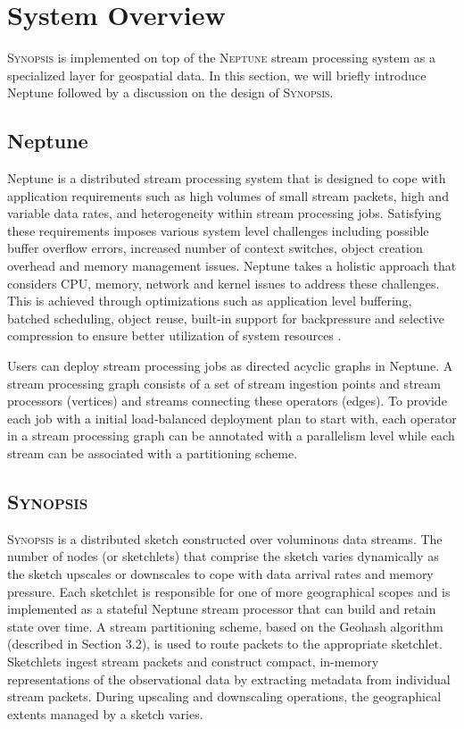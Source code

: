 \section{System Overview}
\label{sec:system}
\textsc{Synopsis} is implemented on top of the \textsc{Neptune} stream processing system \cite{buddhika2016neptune} as a specialized layer for geospatial data.
In this section, we will briefly introduce Neptune followed by a discussion on the design of \textsc{Synopsis}.

\subsection{Neptune}
Neptune is a distributed stream processing system that is designed to cope with application requirements such as high volumes of small stream packets, high and variable data rates, and heterogeneity within stream processing jobs.
Satisfying these requirements imposes various system level challenges including possible buffer overflow errors, increased number of context switches, object creation overhead and memory management issues.
Neptune takes a holistic approach that considers CPU, memory, network and kernel issues to address these challenges.
This is achieved through optimizations such as application level buffering, batched scheduling, object reuse, built-in support for backpressure and selective compression to ensure better utilization of system resources \cite{buddhika2016neptune}.

Users can deploy stream processing jobs as directed acyclic graphs in Neptune.
A stream processing graph consists of a set of stream ingestion points and stream processors (vertices) and streams connecting these operators (edges).
To provide each job with a initial load-balanced deployment plan to start with, each operator in a stream processing graph can be annotated with a parallelism level while each stream can be associated with a partitioning scheme.

\subsection{\textsc{Synopsis}}
\textsc{Synopsis} is a distributed sketch constructed over voluminous data streams.
The number of nodes (or sketchlets) that comprise the sketch varies dynamically as the sketch upscales or downscales to cope with data arrival rates and memory pressure.
Each sketchlet is responsible for one of more geographical scopes and is implemented as a stateful Neptune stream processor that can build and retain state over time.
A stream partitioning scheme, based on the Geohash algorithm (described in Section 3.2), is used to route packets to the appropriate sketchlet.
Sketchlets ingest stream packets and construct compact, in-memory representations of the observational data by extracting metadata from individual stream packets.
During upscaling and downscaling operations, the geographical extents managed by a sketch varies.

